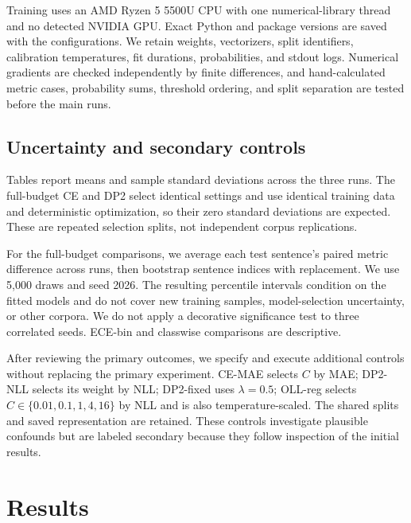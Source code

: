 \documentclass[10pt,twocolumn]{article}
\begin{document}
Training uses an AMD Ryzen 5 5500U CPU with one numerical-library thread and no detected NVIDIA GPU. Exact Python and package versions are saved with the configurations. We retain weights, vectorizers, split identifiers, calibration temperatures, fit durations, probabilities, and stdout logs. Numerical gradients are checked independently by finite differences, and hand-calculated metric cases, probability sums, threshold ordering, and split separation are tested before the main runs.

\subsection{Uncertainty and secondary controls}
Tables report means and sample standard deviations across the three runs. The full-budget CE and DP2 select identical settings and use identical training data and deterministic optimization, so their zero standard deviations are expected. These are repeated selection splits, not independent corpus replications.

For the full-budget comparisons, we average each test sentence's paired metric difference across runs, then bootstrap sentence indices with replacement. We use 5,000 draws and seed 2026. The resulting percentile intervals condition on the fitted models and do not cover new training samples, model-selection uncertainty, or other corpora. We do not apply a decorative significance test to three correlated seeds. ECE-bin and classwise comparisons are descriptive.

After reviewing the primary outcomes, we specify and execute additional controls without replacing the primary experiment. CE-MAE selects $C$ by MAE; DP2-NLL selects its weight by NLL; DP2-fixed uses $\lambda=0.5$; OLL-reg selects $C\in\{0.01,0.1,1,4,16\}$ by NLL and is also temperature-scaled. The shared splits and saved representation are retained. These controls investigate plausible confounds but are labeled secondary because they follow inspection of the initial results.

\section{Results}
\begin{table}[t]
\centering\small
\setlength{\tabcolsep}{4pt}

\caption{Full-budget test results: mean $\pm$ sample standard deviation across three runs. Accuracy, macro-F1, severe-error rate, and 15-bin ECE are percentages. Severe errors span at least two levels. CE median uses the CE probabilities but changes the action. Zero variability reflects identical deterministic fits/settings, not independent replication.}
\label{tab:main}
\end{table}
\end{document}
